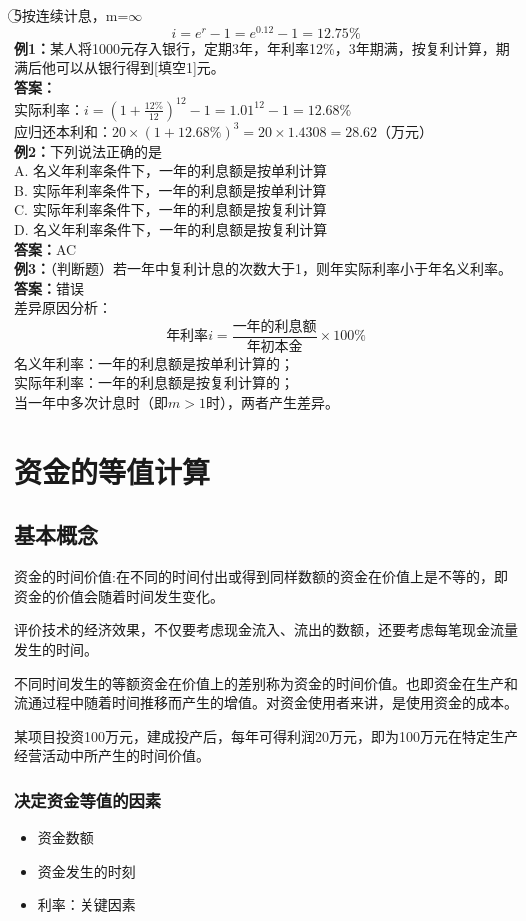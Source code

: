\textcircled{5}按连续计息，m=$\infty$
$$i=e^r-1=e^{0.12}-1=12.75\%$$
\textbf{例1：}某人将1000元存入银行，定期3年，年利率12\%，3年期满，按复利计算，期满后他可以从银行得到[填空1]元。\\
\textbf{答案：}\\
实际利率：$i=(1+\frac{12\%}{12})^{12}-1=1.01^{12}-1=12.68\%$\\
应归还本利和：$20 \times (1+12.68\%)^3=20 \times 1.4308=28.62$（万元）\\
\textbf{例2：}下列说法正确的是\\
A. 名义年利率条件下，一年的利息额是按单利计算
\\
B. 实际年利率条件下，一年的利息额是按单利计算
\\
C. 实际年利率条件下，一年的利息额是按复利计算
\\
D. 名义年利率条件下，一年的利息额是按复利计算\\
\textbf{答案：}AC\\
\textbf{例3：}（判断题）若一年中复利计息的次数大于1，则年实际利率小于年名义利率。\\
\textbf{答案：}错误\\
差异原因分析：
$$\mbox{年利率}i=\frac{\mbox{一年的利息额}}{\mbox{年初本金}} \times 100\%$$
名义年利率：一年的利息额是按单利计算的；\\
实际年利率：一年的利息额是按复利计算的；\\
当一年中多次计息时（即$m>1$时），两者产生差异。


\section{资金的等值计算}

\subsection{基本概念}

资金的时间价值:在不同的时间付出或得到同样数额的资金在价值上是不等的，即资金的价值会随着时间发生变化。

评价技术的经济效果，不仅要考虑现金流入、流出的数额，还要考虑每笔现金流量发生的时间。

不同时间发生的等额资金在价值上的差别称为资金的时间价值。也即资金在生产和流通过程中随着时间推移而产生的增值。对资金使用者来讲，是使用资金的成本。

某项目投资100万元，建成投产后，每年可得利润20万元，即为100万元在特定生产经营活动中所产生的时间价值。

\subsubsection{决定资金等值的因素}
\begin{itemize}
    \item 资金数额
    \item 资金发生的时刻
    \item 利率：关键因素
\end{itemize}

